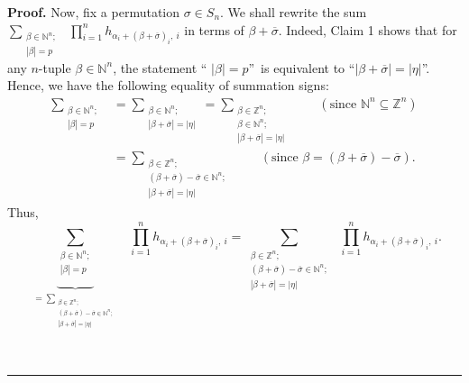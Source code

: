 \documentclass
[numbers=enddot,12pt,final,onecolumn,notitlepage,english]{scrartcl}%
\theoremstyle{definition}
\newenvironment{proof}[1][Proof]{\noindent\textbf{#1.} }{\ \rule{0.5em}{0.5em}}
\let\sumnonlimits\sum
\let\prodnonlimits\prod
\renewcommand{\sum}{\sumnonlimits\limits}
\renewcommand{\prod}{\prodnonlimits\limits}
\newenvironment{verlong}{}{}
\begin{document}
\begin{verlong}
\begin{proof}
Now, fix a permutation $\sigma\in S_{n}$. We shall rewrite the sum
$\sum_{\substack{\beta\in\mathbb{N}^{n};\\\left\vert \beta\right\vert
=p}}\ \ \prod_{i=1}^{n}h_{\alpha_{i}+\left(  \beta+\overline{\sigma}\right)
_{i},\ i}$ in terms of $\beta+\overline{\sigma}$. Indeed, Claim 1 shows that
for any $n$-tuple $\beta\in\mathbb{N}^{n}$, the statement \textquotedblleft%
$\left\vert \beta\right\vert =p$\textquotedblright\ is equivalent to
\textquotedblleft$\left\vert \beta+\overline{\sigma}\right\vert =\left\vert
\eta\right\vert $\textquotedblright. Hence, we have the following equality of
summation signs:%
\begin{align*}
\sum_{\substack{\beta\in\mathbb{N}^{n};\\\left\vert \beta\right\vert =p}}  &
=\sum_{\substack{\beta\in\mathbb{N}^{n};\\\left\vert \beta+\overline{\sigma
}\right\vert =\left\vert \eta\right\vert }}=\sum_{\substack{\beta\in
\mathbb{Z}^{n};\\\beta\in\mathbb{N}^{n};\\\left\vert \beta+\overline{\sigma
}\right\vert =\left\vert \eta\right\vert }}\ \ \ \ \ \ \ \ \ \ \left(
\text{since }\mathbb{N}^{n}\subseteq\mathbb{Z}^{n}\right) \\
&  =\sum_{\substack{\beta\in\mathbb{Z}^{n};\\\left(  \beta+\overline{\sigma
}\right)  -\overline{\sigma}\in\mathbb{N}^{n};\\\left\vert \beta
+\overline{\sigma}\right\vert =\left\vert \eta\right\vert }%
}\ \ \ \ \ \ \ \ \ \ \left(  \text{since }\beta=\left(  \beta+\overline
{\sigma}\right)  -\overline{\sigma}\right)  .
\end{align*}
Thus,%
\[
\underbrace{\sum_{\substack{\beta\in\mathbb{N}^{n};\\\left\vert \beta
\right\vert =p}}}_{\substack{=\sum_{\substack{\beta\in\mathbb{Z}^{n};\\\left(
\beta+\overline{\sigma}\right)  -\overline{\sigma}\in\mathbb{N}^{n}%
;\\\left\vert \beta+\overline{\sigma}\right\vert =\left\vert \eta\right\vert
}}}}\ \ \prod_{i=1}^{n}h_{\alpha_{i}+\left(  \beta+\overline{\sigma}\right)
_{i},\ i}=\sum_{\substack{\beta\in\mathbb{Z}^{n};\\\left(  \beta
+\overline{\sigma}\right)  -\overline{\sigma}\in\mathbb{N}^{n};\\\left\vert
\beta+\overline{\sigma}\right\vert =\left\vert \eta\right\vert }%
}\ \ \prod_{i=1}^{n}h_{\alpha_{i}+\left(  \beta+\overline{\sigma}\right)
_{i},\ i}.
\]



\end{proof}
\end{verlong}
\end{document}
